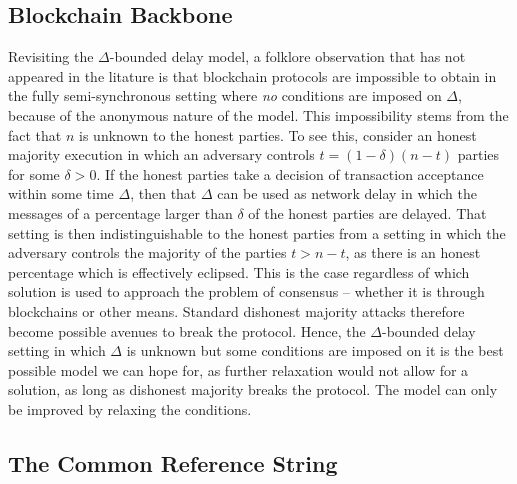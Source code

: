 \subsection{Blockchain Backbone}

\begin{remark}
Revisiting the $\Delta$-bounded delay model, a folklore observation that has not appeared in
the litature is that blockchain protocols are impossible to obtain in the fully
semi-synchronous setting where \emph{no} conditions are imposed on $\Delta$,
because of the anonymous nature of the model. This impossibility stems from the
fact that $n$ is unknown to the honest parties. To see this, consider an
honest majority execution in which an adversary controls $t = (1 - \delta)(n -
t)$ parties for some $\delta > 0$. If the honest parties take a decision of
transaction acceptance within some time $\Delta$, then that $\Delta$ can be used
as network delay in which the messages of a percentage larger than $\delta$ of
the honest parties are delayed. That setting is then indistinguishable to the
honest parties from a setting in which the adversary controls the majority of
the parties $t > n - t$, as there is an honest percentage which is effectively
eclipsed. This is the case regardless of which solution is used to approach the
problem of consensus -- whether it is through blockchains or other means.
Standard dishonest majority attacks therefore become possible avenues to break
the protocol. Hence, the $\Delta$-bounded delay setting in which $\Delta$ is
unknown but some conditions are imposed on it is the best possible model we can
hope for, as further relaxation would not allow for a solution, as long as
dishonest majority breaks the protocol. The model can only be improved by
relaxing the conditions.
\end{remark}


\subsection{The Common Reference String}


